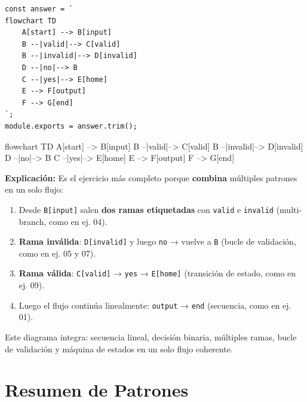\documentclass[10pt,a4paper]{article}
\newenvironment{mermaid}[1][]
  {%
   \begin{mdframed}[%
     linecolor=blue!50!black,
     backgroundcolor=blue!3,
     innertopmargin=6pt,
     innerbottommargin=6pt,
     leftmargin=0pt,
     rightmargin=0pt,
     skipabove=10pt,
     skipbelow=10pt,
     frametitle={Diagrama Mermaid},
     frametitlefont={\small\bfseries\color{blue!70!black}},
   ]%
   \small\ttfamily
  }
  {%
   \end{mdframed}%
  }
\begin{document}
\begin{lstlisting}[style=jsstyle]
const answer = `
flowchart TD
    A[start] --> B[input]
    B --|valid|--> C[valid]
    B --|invalid|--> D[invalid]
    D --|no|--> B
    C --|yes|--> E[home]
    E --> F[output]
    F --> G[end]
`;
module.exports = answer.trim();
\end{lstlisting}

\begin{mermaid}
flowchart TD
    A[start] --> B[input]
    B --|valid|--> C[valid]
    B --|invalid|--> D[invalid]
    D --|no|--> B
    C --|yes|--> E[home]
    E --> F[output]
    F --> G[end]
\end{mermaid}

\textbf{Explicación:}
Es el ejercicio más completo porque \textbf{combina} múltiples patrones
en un solo flujo:

\begin{enumerate}
  \item Desde \texttt{B[input]} salen \textbf{dos ramas etiquetadas}
        con \texttt{valid} e \texttt{invalid} (multi-branch, como en
        ej. 04).
  \item \textbf{Rama inválida}: \texttt{D[invalid]} y luego
        \texttt{no} → vuelve a \texttt{B} (bucle de validación,
        como en ej. 05 y 07).
  \item \textbf{Rama válida}: \texttt{C[valid]} → \texttt{yes} →
        \texttt{E[home]} (transición de estado, como en ej. 09).
  \item Luego el flujo continúa linealmente: \texttt{output} →
        \texttt{end} (secuencia, como en ej. 01).
\end{enumerate}

Este diagrama integra: secuencia lineal, decisión binaria, múltiples
ramas, bucle de validación y máquina de estados en un solo flujo
coherente.

\newpage

\section{Resumen de Patrones}
\end{document}
